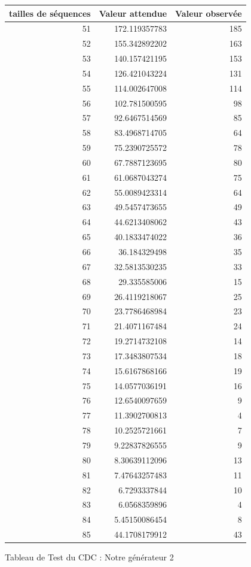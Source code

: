 \documentclass[10pt,a4paper]{article}
\begin{document}
\begin{figure}[h]
\centering
\begin{tabular}{|r|r|r|}
\hline
tailles de séquences  & Valeur attendue & Valeur observée\\
\hline
51 & 172.119357783 & 185\\
52 & 155.342892202 & 163\\
53 & 140.157421195 & 153\\
54 & 126.421043224 & 131\\
55 & 114.002647008 & 114\\
56 & 102.781500595 & 98\\
57 & 92.6467514569 & 85\\
58 & 83.4968714705 & 64\\
59 & 75.2390725572 & 78\\
60 & 67.7887123695 & 80\\
61 & 61.0687043274 & 75\\
62 & 55.0089423314 & 64\\
63 & 49.5457473655 & 49\\
64 & 44.6213408062 & 43\\
65 & 40.1833474022 & 36\\
66 & 36.184329498 & 35\\
67 & 32.5813530235 & 33\\
68 & 29.335585006 & 15\\
69 & 26.4119218067 & 25\\
70 & 23.7786468984 & 23\\
71 & 21.4071167484 & 24\\
72 & 19.2714732108 & 14\\
73 & 17.3483807534 & 18\\
74 & 15.6167868166 & 19\\
75 & 14.0577036191 & 16\\
76 & 12.6540097659 & 9\\
77 & 11.3902700813 & 4\\
78 & 10.2525721661 & 7\\
79 & 9.22837826555 & 9\\
80 & 8.30639112096 & 13\\
81 & 7.47643257483 & 11\\
82 & 6.7293337844 & 10\\
83 & 6.0568359896 & 4\\
84 & 5.45150086454 & 8\\
85 & 44.1708179912 & 43\\
\hline
\end{tabular}
\caption{Tableau de Test du CDC : Notre générateur 2}
\end{figure}
\end{document}
